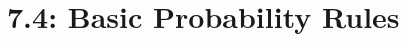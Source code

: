 \documentclass[Lecture.tex]{subfiles}
\begin{document}
\section{7.4: Basic Probability Rules}

\begin{frame}

\end{frame}
\end{document}
